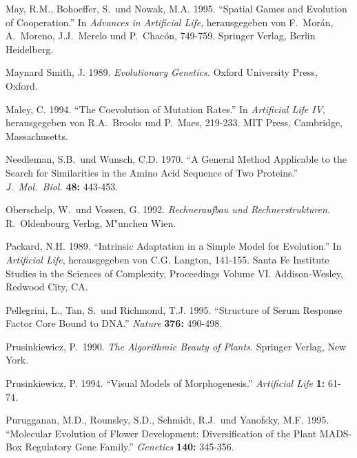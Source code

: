 \begin{thebibliography}{99}
May, R.M., Bohoeffer, S.\ und Nowak, M.A. 1995. "`Spatial Games and Evolution of Cooperation."'
In \textsl{Advances in Artificial Life}, herausgegeben von F.\ Mor{\'a}n, A.\ Moreno,
J.J.\ Merelo und P.\ Chac{\'o}n, 749-759. Springer Verlag, Berlin Heidelberg.

Maynard Smith, J. 1989. \textsl{Evolutionary Genetics.} Oxford University Press, Oxford.

Maley, C. 1994. "`The Coevolution of Mutation Rates."'
In \textsl{Artificial Life IV}, herausgegeben von R.A.\ Brooks und
P.\ Maes, 219-233. MIT Press, Cambridge, Massachusetts.


Needleman, S.B.\ und Wunsch, C.D. 1970. "`A General Method Applicable to the Search for
Similarities in the Amino Acid Sequence of Two Proteins."' \textsl{J.\ Mol.\ Biol.} \textbf{48:} 443-453.

Oberschelp, W.\ und Vossen, G. 1992. \textsl{Rechneraufbau und Rechnerstrukturen.}
R.\ Oldenbourg Verlag, M"unchen Wien.

Packard, N.H. 1989. "`Intrinsic Adaptation in a Simple Model for Evolution."' In \textsl{Artificial 
Life}, herausgegeben von C.G. Langton, 141-155. Santa Fe Institute Studies in the Sciences 
of Complexity, Proceedings Volume VI. Addison-Wesley, Redwood City, CA.


Pellegrini, L., Tan, S.\ und Richmond, T.J. 1995. "`Structure of Serum Response Factor Core Bound to DNA."'
\textsl{Nature} \textbf{376:} 490-498.

Prusinkiewicz, P.\ 1990. \textsl{The Algorithmic Beauty of Plants.} Springer Verlag,
New York.

Prusinkiewicz, P. 1994. "`Visual Models of Morphogenesis."' \textsl{Artificial Life}
\textbf{1:} 61-74.

Purugganan, M.D., Rounsley, S.D., Schmidt, R.J.\ und Yanofsky, M.F. 1995. "`Molecular Evolution of Flower
Development: Diversification of the Plant MADS-Box Regulatory Gene Family."' \textsl{Genetics}
\textbf{140:} 345-356.


\end{thebibliography}
